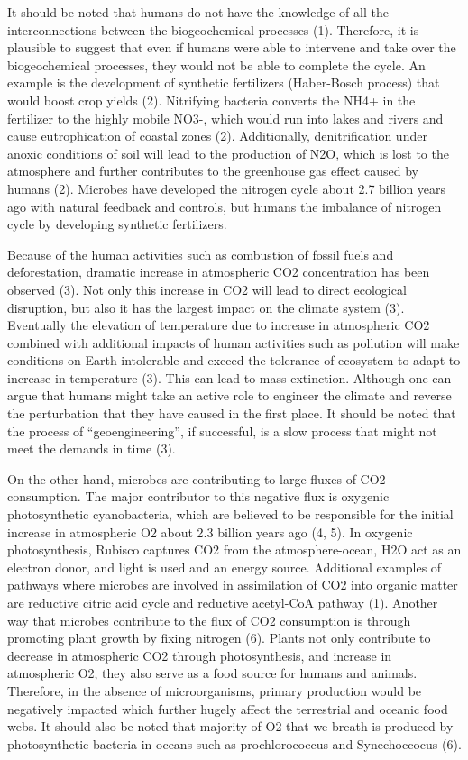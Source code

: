 \documentclass[]{article}
\begin{document}
It should be noted that humans do not have the knowledge of all the
interconnections between the biogeochemical processes (1). Therefore, it
is plausible to suggest that even if humans were able to intervene and
take over the biogeochemical processes, they would not be able to
complete the cycle. An example is the development of synthetic
fertilizers (Haber-Bosch process) that would boost crop yields (2).
Nitrifying bacteria converts the NH4+ in the fertilizer to the highly
mobile NO3-, which would run into lakes and rivers and cause
eutrophication of coastal zones (2). Additionally, denitrification under
anoxic conditions of soil will lead to the production of N2O, which is
lost to the atmosphere and further contributes to the greenhouse gas
effect caused by humans (2). Microbes have developed the nitrogen cycle
about 2.7 billion years ago with natural feedback and controls, but
humans the imbalance of nitrogen cycle by developing synthetic
fertilizers.

Because of the human activities such as combustion of fossil fuels and
deforestation, dramatic increase in atmospheric CO2 concentration has
been observed (3). Not only this increase in CO2 will lead to direct
ecological disruption, but also it has the largest impact on the climate
system (3). Eventually the elevation of temperature due to increase in
atmospheric CO2 combined with additional impacts of human activities
such as pollution will make conditions on Earth intolerable and exceed
the tolerance of ecosystem to adapt to increase in temperature (3). This
can lead to mass extinction. Although one can argue that humans might
take an active role to engineer the climate and reverse the perturbation
that they have caused in the first place. It should be noted that the
process of ``geoengineering'', if successful, is a slow process that
might not meet the demands in time (3).

On the other hand, microbes are contributing to large fluxes of CO2
consumption. The major contributor to this negative flux is oxygenic
photosynthetic cyanobacteria, which are believed to be responsible for
the initial increase in atmospheric O2 about 2.3 billion years ago (4,
5). In oxygenic photosynthesis, Rubisco captures CO2 from the
atmosphere-ocean, H2O act as an electron donor, and light is used and an
energy source. Additional examples of pathways where microbes are
involved in assimilation of CO2 into organic matter are reductive citric
acid cycle and reductive acetyl-CoA pathway (1). Another way that
microbes contribute to the flux of CO2 consumption is through promoting
plant growth by fixing nitrogen (6). Plants not only contribute to
decrease in atmospheric CO2 through photosynthesis, and increase in
atmospheric O2, they also serve as a food source for humans and animals.
Therefore, in the absence of microorganisms, primary production would be
negatively impacted which further hugely affect the terrestrial and
oceanic food webs. It should also be noted that majority of O2 that we
breath is produced by photosynthetic bacteria in oceans such as
prochlorococcus and Synechoccocus (6).
\end{document}
